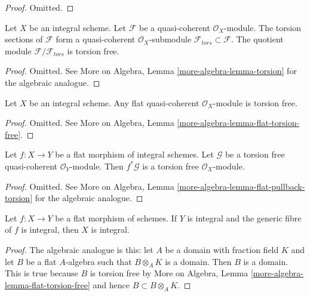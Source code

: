 \begin{proof}
Omitted.
\end{proof}

\begin{lemma}
\label{lemma-torsion}
Let $X$ be an integral scheme. Let $\mathcal{F}$ be a quasi-coherent
$\mathcal{O}_X$-module. The torsion sections of $\mathcal{F}$ form
a quasi-coherent $\mathcal{O}_X$-submodule
$\mathcal{F}_{tors} \subset \mathcal{F}$.
The quotient module $\mathcal{F}/\mathcal{F}_{tors}$ is torsion free.
\end{lemma}

\begin{proof}
Omitted. See More on Algebra, Lemma \ref{more-algebra-lemma-torsion}
for the algebraic analogue.
\end{proof}

\begin{lemma}
\label{lemma-flat-torsion-free}
Let $X$ be an integral scheme. Any flat quasi-coherent $\mathcal{O}_X$-module
is torsion free.
\end{lemma}

\begin{proof}
Omitted. See More on Algebra, Lemma \ref{more-algebra-lemma-flat-torsion-free}.
\end{proof}

\begin{lemma}
\label{lemma-flat-pullback-torsion}
Let $f : X \to Y$ be a flat morphism of integral schemes.
Let $\mathcal{G}$ be a torsion free quasi-coherent $\mathcal{O}_Y$-module.
Then $f^*\mathcal{G}$ is a torsion free $\mathcal{O}_X$-module.
\end{lemma}

\begin{proof}
Omitted. See
More on Algebra, Lemma \ref{more-algebra-lemma-flat-pullback-torsion}
for the algebraic analogue.
\end{proof}

\begin{lemma}
\label{lemma-flat-over-integral-integral-fibre}
Let $f : X \to Y$ be a flat morphism of schemes. If $Y$ is integral
and the generic fibre of $f$ is integral, then $X$ is integral.
\end{lemma}

\begin{proof}
The algebraic analogue is this: let $A$ be a domain with fraction
field $K$ and let $B$ be a flat $A$-algebra such that $B \otimes_A K$
is a domain. Then $B$ is a domain. This is true because $B$ is
torsion free by More on Algebra, Lemma
\ref{more-algebra-lemma-flat-torsion-free}
and hence $B \subset B \otimes_A K$.
\end{proof}

